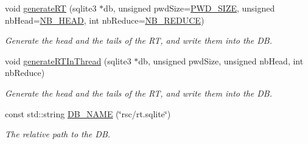 \begin{DoxyCompactItemize}
void \hyperlink{namespacebe_1_1esi_1_1secl_1_1pn_abd22f0fb1b69636d22a3f698f3683085}{generate\+RT} (sqlite3 $\ast$db, unsigned pwd\+Size=\hyperlink{namespacebe_1_1esi_1_1secl_1_1pn_a233e474af3fb15b935a71709407307ec}{P\+W\+D\+\_\+\+S\+I\+ZE}, unsigned nb\+Head=\hyperlink{namespacebe_1_1esi_1_1secl_1_1pn_a4315be4236bbf06dd631d0e6dc87fc41}{N\+B\+\_\+\+H\+E\+AD}, int nb\+Reduce=\hyperlink{namespacebe_1_1esi_1_1secl_1_1pn_a712c184235263459041b774c8229fc1b}{N\+B\+\_\+\+R\+E\+D\+U\+CE})
\begin{DoxyCompactList}\small\item\em Generate the head and the tails of the RT, and write them into the DB. \end{DoxyCompactList}\item 
void \hyperlink{namespacebe_1_1esi_1_1secl_1_1pn_ab195afc2c7a35cd9a6bc48e990567fdf}{generate\+R\+T\+In\+Thread} (sqlite3 $\ast$db, unsigned pwd\+Size, unsigned nb\+Head, int nb\+Reduce)
\begin{DoxyCompactList}\small\item\em Generate the head and the tails of the RT, and write them into the DB. \end{DoxyCompactList}\item 
const std\+::string \hyperlink{namespacebe_1_1esi_1_1secl_1_1pn_a7e1929f4bc962788d33baa1e2f20387b}{D\+B\+\_\+\+N\+A\+ME} (\char`\"{}rsc/rt.\+sqlite\char`\"{})
\begin{DoxyCompactList}\small\item\em The relative path to the DB. \end{DoxyCompactList}\end{DoxyCompactItemize}
